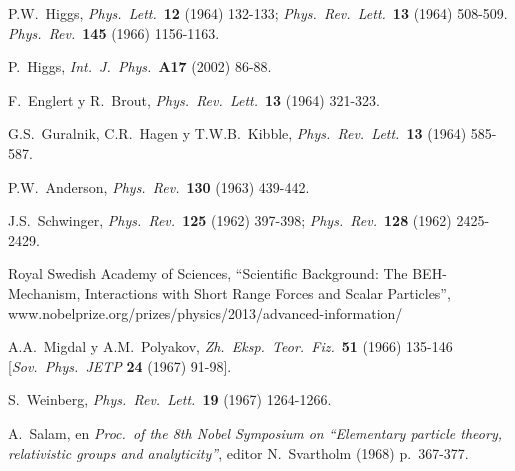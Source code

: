 \begin{thebibliography}{10}

 P.W.\ Higgs,
{\em Phys.\ Lett.}\ {\bf 12} (1964) 132-133;
{\em Phys.\ Rev.\ Lett.}\ {\bf 13} (1964) 508-509.
{\em Phys.\ Rev.}\ {\bf 145} (1966) 1156-1163.

 P.\ Higgs,
{\em Int.\ J.\ Phys.}\ {\bf A17} (2002) 86-88.

 F.\ Englert y R.\ Brout,
{\em Phys.\ Rev.\ Lett.}\ {\bf 13} (1964) 321-323.

 G.S.\ Guralnik, C.R.\ Hagen y T.W.B.\ Kibble,
{\em Phys.\ Rev.\ Lett.}\ {\bf 13} (1964) 585-587.

 P.W.\ Anderson,
{\it Phys.\ Rev.}\ {\bf 130} (1963) 439-442.

 J.S.\ Schwinger,
  {\em Phys.\ Rev.}\ {\bf 125} (1962) 397-398;
{\em Phys.\ Rev.}\ {\bf 128} (1962) 2425-2429.

 Royal Swedish Academy of Sciences,
  ``Scientific Background: The BEH-Mechanism, Interactions with Short
  Range Forces and Scalar Particles'',\\
  www.nobelprize.org/prizes/physics/2013/advanced-information/
  
 A.A.\ Migdal y A.M.\ Polyakov,
{\em Zh.\ Eksp.\ Teor.\ Fiz.}\ {\bf 51} (1966) 135-146 
[{\em Sov.\ Phys.\ JETP} {\bf 24} (1967) 91-98].

 S.\ Weinberg,
{\em Phys.\ Rev.\ Lett.}\ {\bf 19} (1967) 1264-1266.

 A.\ Salam,
  en {\em Proc.\ of the 8th Nobel Symposium on ``Elementary
  particle theory, relativistic groups and analyticity''},
  editor N.\ Svartholm (1968) p.\ 367-377.


\end{thebibliography}
